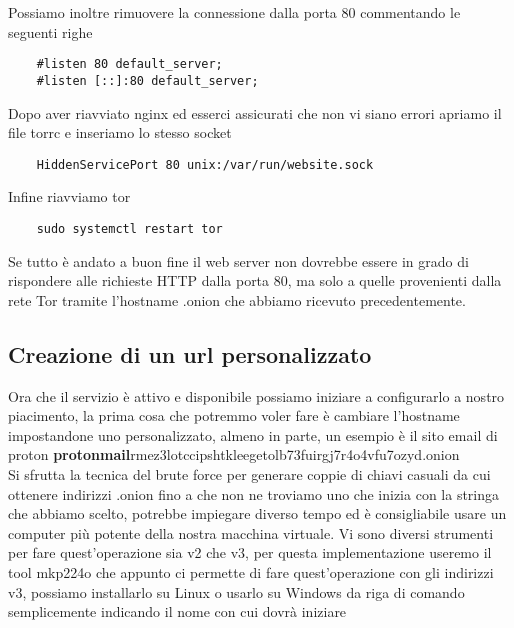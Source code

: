 Possiamo inoltre rimuovere la connessione dalla porta 80 commentando le seguenti righe
\begin{lstlisting}
    #listen 80 default_server;
    #listen [::]:80 default_server;
\end{lstlisting}

Dopo aver riavviato nginx ed esserci assicurati che non vi siano errori apriamo il file torrc e inseriamo lo stesso socket
\begin{lstlisting}
    HiddenServicePort 80 unix:/var/run/website.sock
\end{lstlisting}

Infine riavviamo tor
\begin{lstlisting}
    sudo systemctl restart tor
\end{lstlisting}
Se tutto è andato a buon fine il web server non dovrebbe essere in grado di rispondere alle richieste HTTP dalla porta 80, ma solo a quelle provenienti dalla rete Tor tramite l'hostname .onion che abbiamo ricevuto precedentemente. \\


\newpage
\subsection{Creazione di un url personalizzato}
Ora che il servizio è attivo e disponibile possiamo iniziare a configurarlo a nostro piacimento, la prima cosa che potremmo voler fare è cambiare l'hostname impostandone uno personalizzato, almeno in parte, un esempio è il sito email di proton \textbf{protonmail}rmez3lotccipshtkleegetolb73fuirgj7r4o4vfu7ozyd.onion \\
Si sfrutta la tecnica del brute force per generare coppie di chiavi casuali da cui ottenere indirizzi .onion fino a che non ne troviamo uno che inizia con la stringa che abbiamo scelto, potrebbe impiegare diverso tempo ed è consigliabile usare un computer più potente della nostra macchina virtuale. 
Vi sono diversi strumenti per fare quest'operazione sia v2 che v3, per questa implementazione useremo il tool mkp224o \cite{V3AddressGeneratorRepo} che appunto ci permette di fare quest'operazione con gli indirizzi v3, possiamo installarlo su Linux o usarlo su Windows da riga di comando semplicemente indicando il nome con cui dovrà iniziare

